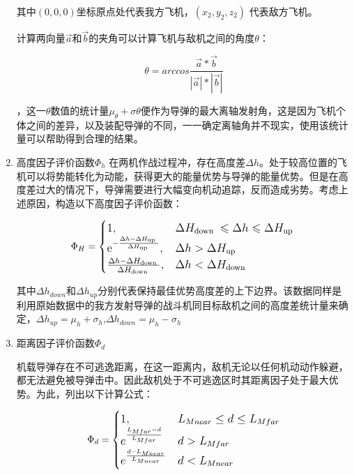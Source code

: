 \documentclass{my_paper}
\begin{document}
\begin{enumerate}
    其中$ (0,0,0) $坐标原点处代表我方飞机，$ (x_2,y_2,z_2) $ 代表敌方飞机。

    计算两向量$ \vec{a} $和$ \vec{b} $的夹角可以计算飞机与敌机之间的角度$ \theta $：

    \begin{equation}
    \theta = arccos\frac{\vec{a}*\vec{b}}{|\vec{a}|*|\vec{b}|}
    \end{equation}

    ，这一$\theta$数值的统计量$\mu_{\theta}+\sigma{\theta}$便作为导弹的最大离轴发射角，这是因为飞机个体之间的差异，以及装配导弹的不同，一一确定离轴角并不现实，使用该统计量可以帮助得到合理的结果。
    \item 高度因子评价函数$\Phi _{h}$
    在两机作战过程冲，存在高度差$\Delta h$。处于较高位置的飞机可以将势能转化为动能，获得更大的能量优势与导弹的能量优势。但是在高度差过大的情况下，导弹需要进行大幅变向机动追踪，反而造成劣势。考虑上述原因，构造以下高度因子评价函数：

    \begin{equation}
        \large\Phi_{H}= \begin{cases}1, &  \Delta H_{\text {down }} \leqslant \Delta h \leqslant  \Delta H_{\text {up }} \\ \mathrm{e}^{-\frac{\Delta h - \Delta H_{\text {up }}}{\Delta H_{\text {up }}}}, & \Delta h> \Delta H_{\text {up }} \\ \frac{\Delta h- \Delta H_{\text {down }}}{\Delta H_{\text {down }}}, & \Delta h< \Delta H_{\text {down }}\end{cases}
    \end{equation}

    其中$ \Delta h _{down} $和$ \Delta h _{up} $分别代表保持最佳优势高度差的上下边界。该数据同样是利用原始数据中的我方发射导弹的战斗机同目标敌机之间的高度差统计量来确定，$\Delta h_{up} = \mu_h + \sigma_h$,$\Delta h_{down} = \mu_h - \sigma_h$

    
    \item 距离因子评价函数$\Phi _{d}$
    
    机载导弹存在不可逃逸距离\cite{10}，在这一距离内，敌机无论以任何机动动作躲避，都无法避免被导弹击中。因此敌机处于不可逃逸区时其距离因子处于最大优势。为此，列出以下计算公式：

    \begin{equation}
        \large\Phi_{d}=\begin{cases}1,&L_{Mnear}\leq d \leq L_{Mfar}\\e^{\frac{L_{Mfar}-d}{L_{Mfar}}} &d>L_{Mfar}\\e^{\frac{d-L_{Mnear}}{L_{Mnear}}} &d<L_{Mnear}\end{cases}
    \end{equation}
    

\end{enumerate}
\end{document}
